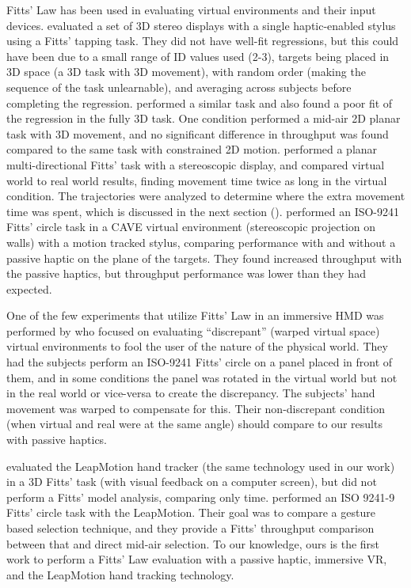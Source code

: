 Fitts' Law has been used in evaluating virtual environments and their input devices.
\citet{chun_evaluating_2004} evaluated a set of 3D stereo displays with a single haptic-enabled stylus using a Fitts' tapping task.
They did not have well-fit regressions, but this could have been due to a small range of ID values used (2-3), targets being placed in 3D space (a 3D task with 3D movement), with random order (making the sequence of the task un\-learn\-able), and averaging across subjects before completing the regression.
\citet{teather_evaluating_2010} performed a similar task and also found a poor fit of the regression in the fully 3D task.
One condition performed a mid-air 2D planar task with 3D movement, and no significant difference in throughput was found compared to the same task with constrained 2D motion.
\citet{liu_comparing_2009} performed a planar multi-directional Fitts' task with a stereoscopic display, and compared virtual world to real world results, finding movement time twice as long in the virtual condition.
The trajectories were analyzed to determine where the extra movement time was spent, which is discussed in the next section ().
\citet{teather_pointing_2011} performed an ISO-9241 Fitts' circle task in a CAVE virtual environment (stereoscopic projection on walls) with a motion tracked stylus, comparing performance with and without a passive haptic on the plane of the targets.
They found increased throughput with the passive haptics, but throughput performance was lower than they had expected.

One of the few experiments that utilize Fitts' Law in an immersive HMD was performed by \citet{kohli_redirected_2012} who focused on evaluating ``discrepant'' (warped virtual space) virtual environments to fool the user of the nature of the physical world.
They had the subjects perform an ISO-9241 Fitts' circle on a panel placed in front of them, and in some conditions the panel was rotated in the virtual world but not in the real world or vice-versa to create the discrepancy.
The subjects' hand movement was warped to compensate for this.
Their non-discrepant condition (when virtual and real were at the same angle) should compare to our results with passive haptics.

\citet{coelho_pointing_2014} evaluated the LeapMotion hand tracker (the same technology used in our work) in a 3D Fitts' task (with visual feedback on a computer screen), but did not perform a Fitts' model analysis, comparing only time.
\citet{seixas_one_2015} performed an ISO 9241-9 Fitts' circle task with the LeapMotion.
Their goal was to compare a gesture based selection technique, and they provide a Fitts' throughput comparison between that and direct mid-air selection.
To our knowledge, ours is the first work to perform a Fitts' Law evaluation with a passive haptic, immersive VR, and the LeapMotion hand tracking technology.

